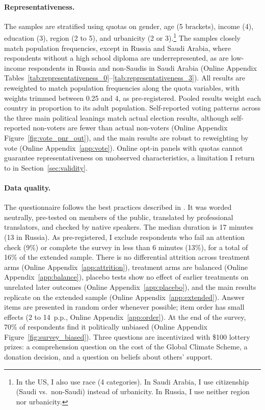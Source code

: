 \documentclass[12pt,english]{article}
\begin{document}
\paragraph{Representativeness.}\label{par:representativeness} The samples are stratified using quotas on gender, age (5 brackets), income (4), education (3), region (2 to 5), and urbanicity (2 or 3).\footnote{In the US, I also use race (4 categories). In Saudi Arabia, I use citizenship (Saudi vs.\ non-Saudi) instead of urbanicity. In Russia, I use neither region nor urbanicity.} The samples closely match population frequencies, except in Russia and Saudi Arabia, where respondents without a high school diploma are underrepresented, as are low-income respondents in Russia and non-Saudis in Saudi Arabia (Online Appendix Tables~\ref{tab:representativeness_0}--\ref{tab:representativeness_3}). All results are reweighted to match population frequencies along the quota variables, with weights trimmed between 0.25 and 4, as pre-registered. Pooled results weight each country in proportion to its adult population. Self-reported voting patterns across the three main political leanings match actual election results, although self-reported non-voters are fewer than actual non-voters (Online Appendix Figure~\ref{fig:vote_pnr_out}), and the main results are robust to reweighting by vote (Online Appendix~\ref{app:vote}). Online opt-in panels with quotas cannot guarantee representativeness on unobserved characteristics, a limitation I return to in Section~\ref{sec:validity}.

\paragraph{Data quality.}\label{par:data_quality} The questionnaire follows the best practices described in \cite{stantcheva_how_2023}. It was worded neutrally, pre-tested on members of the public, translated by professional translators, and checked by native speakers. The median duration is 17 minutes (13 in Russia). As pre-registered, I exclude respondents who fail an attention check (9\%) or complete the survey in less than 6 minutes (13\%), for a total of 16\% of the extended sample. There is no differential attrition across treatment arms (Online Appendix~\ref{app:attrition}), treatment arms are balanced (Online Appendix~\ref{app:balance}), placebo tests show no effect of earlier treatments on unrelated later outcomes (Online Appendix~\ref{app:placebo}), and the main results replicate on the extended sample (Online Appendix~\ref{app:extended}). Answer items are presented in random order whenever possible; item order has small effects (2 to 14~p.p., Online Appendix~\ref{app:order}). At the end of the survey, 70\% of respondents find it politically unbiased (Online Appendix Figure~\ref{fig:survey_biased}). Three questions are incentivized with \$100 lottery prizes: a comprehension question on the cost of the Global Climate Scheme, a donation decision, and a question on beliefs about others' support.
\end{document}
